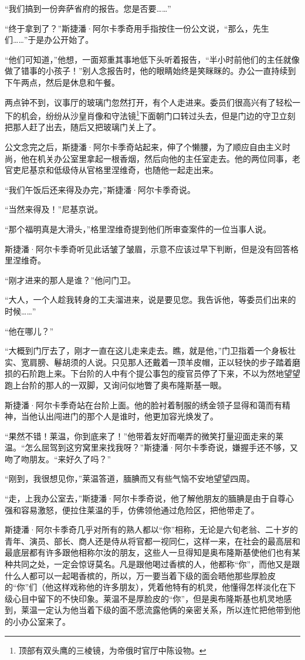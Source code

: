 \par “我们搞到一份奔萨省府的报告。您是否要……”
\par “终于拿到了？”斯捷潘·阿尔卡季奇用手指按住一份公文说，“那么，先生们……”于是办公开始了。
\par “他们可知道，”他想，一面郑重其事地低下头听着报告，“半小时前他们的主任就像做了错事的小孩子！”别人念报告时，他的眼睛始终是笑眯眯的。办公一直持续到下午两点，然后是休息和午餐。
\par 两点钟不到，议事厅的玻璃门忽然打开，有个人走进来。委员们很高兴有了轻松一下的机会，纷纷从沙皇肖像和守法镜\footnote{顶部有双头鹰的三棱镜，为帝俄时官厅中陈设物。}下面朝门口转过头去，但是门边的守卫立刻把那人赶了出去，随后又把玻璃门关上了。
\par 公文念完之后，斯捷潘·阿尔卡季奇站起来，伸了个懒腰，为了顺应自由主义时尚，他在机关办公室里拿起一根香烟，然后向他的主任室走去。他的两位同事，老官吏尼基京和低级侍从官格里涅维奇，也随他一起走出来。
\par “我们午饭后还来得及办完，”斯捷潘·阿尔卡季奇说。
\par “当然来得及！”尼基京说。
\par “那个福明真是大滑头，”格里涅维奇提到他们所审查案件的一位当事人说。
\par 斯捷潘·阿尔卡季奇听见此话皱了皱眉，示意不应该过早下判断，但是没有回答格里涅维奇。
\par “刚才进来的那人是谁？”他问门卫。
\par “大人，一个人趁我转身的工夫溜进来，说是要见您。我告诉他，等委员们出来的时候……”
\par “他在哪儿？”
\par “大概到门厅去了，刚才一直在这儿走来走去。瞧，就是他，”门卫指着一个身板壮实、宽肩膀、鬈胡须的人说。只见那人还戴着一顶羊皮帽，正以轻快的步子踏着磨损的石阶跑上来。下台阶的人中有个提公事包的瘦官员停了下来，不以为然地望望跑上台阶的那人的一双脚，又询问似地瞥了奥布隆斯基一眼。
\par 斯捷潘·阿尔卡季奇站在台阶上面。他的脸衬着制服的绣金领子显得和蔼而有精神，当他认出闯进门的那个人是谁时，他更加容光焕发了。
\par “果然不错！莱温，你到底来了！”他带着友好而嘲弄的微笑打量迎面走来的莱温。“怎么屈驾到这穷窝里来找我呀？”斯捷潘·阿尔卡季奇说，嫌握手还不够，又吻了吻朋友。“来好久了吗？”
\par “刚到，我很想见你，”莱温答道，腼腆而又有些气恼不安地望望四周。
\par “走，上我办公室去，”斯捷潘·阿尔卡季奇说，他了解他朋友的腼腆是由于自尊心强和容易激怒，便拉住莱温的手，仿佛领他通过危险区，把他带走了。
\par 斯捷潘·阿尔卡季奇几乎对所有的熟人都以“你”相称，无论是六旬老翁、二十岁的青年、演员、部长、商人还是侍从将官都一视同仁，这样一来，在社会的最高层和最底层都有许多跟他相称尔汝的朋友，这些人一旦得知是奥布隆斯基使他们也有某种共同之处，一定会惊讶莫名。凡是跟他喝过香槟的人，他都称“你”，而他又是跟什么人都可以一起喝香槟的，所以，万一要当着下级的面会晤他那些厚脸皮的“你”们（他这样戏称他的许多朋友），凭着他特有的机灵，他懂得怎样淡化在下级心目中留下的不快印象。莱温不是厚脸皮的“你”，但是奥布隆斯基也机灵地感到，莱温一定认为他当着下级的面不愿流露他俩的亲密关系，所以连忙把他带到他的小办公室来了。
